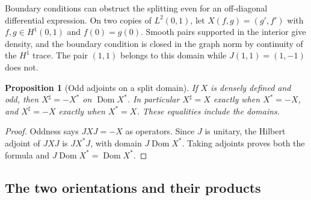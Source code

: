 \documentclass[11pt]{article}
\newtheorem{proposition}{Proposition}[section]
\theoremstyle{definition}
\begin{document}
Boundary conditions can obstruct the splitting even for an off-diagonal differential expression. On two copies of $L^2(0,1)$, let $X(f,g)=(g',f')$ with $f,g\in H^1(0,1)$ and $f(0)=g(0)$. Smooth pairs supported in the interior give density, and the boundary condition is closed in the graph norm by continuity of the $H^1$ trace. The pair $(1,1)$ belongs to this domain while $J(1,1)=(1,-1)$ does not.

\begin{proposition}[Odd adjoints on a split domain]
\label{prop:odd-block-adjoints}
If $X$ is densely defined and odd, then $X^\sharp=-X^*$ on $\operatorname{Dom}X^*$. In particular $X^\sharp=X$ exactly when $X^*=-X$, and $X^\sharp=-X$ exactly when $X^*=X$. These equalities include the domains.
\end{proposition}
\begin{proof}
Oddness says $JXJ=-X$ as operators. Since $J$ is unitary, the Hilbert adjoint of $JXJ$ is $JX^*J$, with domain $J\operatorname{Dom}X^*$. Taking adjoints proves both the formula and $J\operatorname{Dom}X^*=\operatorname{Dom}X^*$.
\end{proof}

\subsection{The two orientations and their products}
\end{document}
